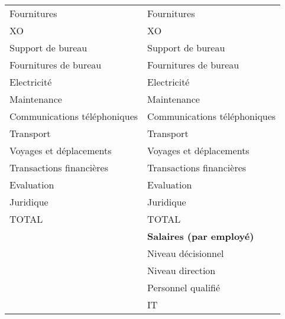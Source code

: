 \documentclass[12pt]{article}
\begin{document}
\begin{longtable}{|l|l|}
 Fournitures                                       &  Fournitures                                        \\
 XO                                                &  XO                                                 \\
 Support de bureau                                 &  Support de bureau                                  \\
 Fournitures de bureau                             &  Fournitures de bureau                              \\
 Electricité                                       &  Electricité                                        \\
 Maintenance                                       &  Maintenance                                        \\
 Communications téléphoniques                      &  Communications téléphoniques                       \\
 Transport                                         &  Transport                                          \\
 Voyages et déplacements                           &  Voyages et déplacements                            \\
 Transactions financières                          &  Transactions financières                           \\
 Evaluation                                        &  Evaluation                                         \\
 Juridique                                         &  Juridique                                          \\
 TOTAL                                             &  TOTAL                                              \\
\hline
                                                   &  \textbf{Salaires (par employé)}                    \\
                                                   &  Niveau décisionnel                                 \\
                                                   &  Niveau direction                                   \\
                                                   &  Personnel qualifié                                 \\
                                                   &  IT                                                 \\

\end{longtable}
\end{document}
